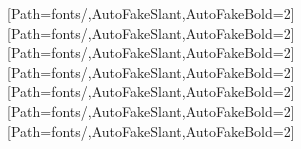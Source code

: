 
\renewcommand{\algorithmicrequire}{\textbf{输入:}}
\renewcommand{\algorithmicensure}{\textbf{输出:}}


[Path=fonts/,AutoFakeSlant,AutoFakeBold={2}]     %
\newcommand{\song}{\CJKfamily{song}}                                                    %
[Path=fonts/,AutoFakeSlant,AutoFakeBold={2}]       %
\newcommand{\hei}{\CJKfamily{hei}}                                                      %
[Path=fonts/,AutoFakeSlant,AutoFakeBold={2}]      %
\newcommand{\kai}{\CJKfamily{kai}}                                                      %
[Path=fonts/,AutoFakeSlant,AutoFakeBold={2}]          %
\newcommand{\li}{\CJKfamily{li}}                                                        %
[Path=fonts/,AutoFakeSlant,AutoFakeBold={2}]
[Path=fonts/,AutoFakeSlant,AutoFakeBold={2}]
[Path=fonts/,AutoFakeSlant,AutoFakeBold={2}]
\usepackage{unicode-math}
\setmainfont{Times New Roman}
\setsansfont{Arial}
\setmonofont{Times New Roman}


